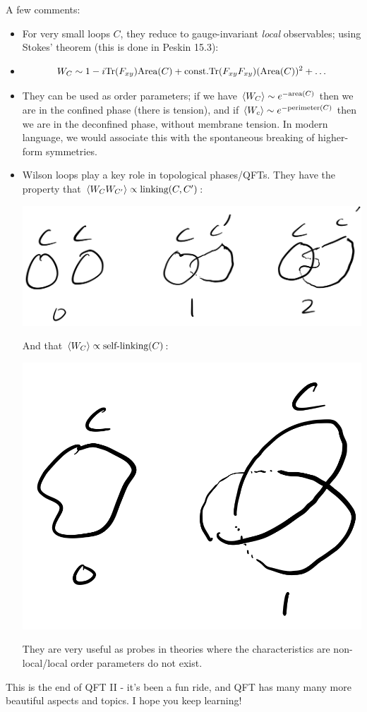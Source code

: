 A few comments:
\begin{itemize}
    \item For very small loops $C$, they reduce to gauge-invariant \emph{local} observables; using Stokes' theorem (this is done in Peskin 15.3):
    \item \begin{equation}
        W_C \sim 1 - i\mathrm{Tr}(F_{xy})\text{Area}(C) + \text{const.} \mathrm{Tr}(F_{xy}F_{xy})(\text{Area}(C))^2 + \ldots
    \end{equation}
    \item They can be used as order parameters; if we have $\left< W_C \right> \sim e^{-\text{area}(C)}$ then we are in the confined phase (there is tension), and if $\left< W_c \right> \sim e^{-\text{perimeter}(C)}$ then we are in the deconfined phase, without membrane tension. In modern language, we would associate this with the spontaneous breaking of higher-form symmetries.
    \item Wilson loops play a key role in topological phases/QFTs. They have the property that $\left< W_CW_{C'} \right> \propto \text{linking}(C, C')$:
    \begin{center}
        \includegraphics[scale=0.35]{Lectures/Images/lec17-linking.png}
    \end{center}
    
    And that $\left< W_C \right> \propto \text{self-linking}(C)$:

    \begin{center}
        \includegraphics[scale=0.35]{Lectures/Images/lec17-selflinking.png}
    \end{center}

    They are very useful as probes in theories where the characteristics are non-local/local order parameters do not exist.
\end{itemize}

This is the end of QFT II - it's been a fun ride, and QFT has many many more beautiful aspects and topics. I hope you keep learning!